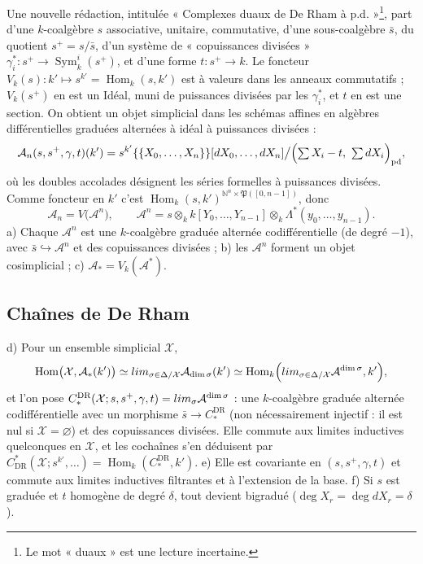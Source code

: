 \documentclass[11pt,a4paper]{article}
\begin{document}
Une nouvelle rédaction, intitulée « Complexes duaux de De Rham à
p.d. »\footnote{Le mot « duaux » est une lecture incertaine.}, part d'une
$k$-coalgèbre $s$ associative, unitaire, commutative, d'une sous-coalgèbre
$\bar s$, du quotient $s^+ = s/\bar s$, d'un système de « copuissances
divisées » $\gamma^*_i : s^+ \to \operatorname{Sym}^i_k(s^+)$, et d'une forme
$t : s^+ \to k$. Le foncteur $V_k(s) : k' \mapsto s^{k'} =
\operatorname{Hom}_k(s, k')$ est à valeurs dans les anneaux commutatifs ;
$V_k(s^+)$ en est un Idéal, muni de puissances divisées par les
$\gamma^*_i$, et $t$ en est une section. On obtient un objet simplicial dans les
schémas affines en algèbres différentielles graduées alternées à idéal à
puissances divisées :
\[
\mathcal{A}_n(s,s^+,\gamma,t)(k') = s^{k'}\{\{X_0,\ldots,X_n\}\}[dX_0,\ldots,dX_n] \big/ \Bigl(\textstyle\sum X_i - t,\ \sum dX_i\Bigr)_{\mathrm{pd}} ,
\]
où les doubles accolades désignent les séries formelles à puissances
divisées. Comme foncteur en $k'$ c'est $\operatorname{Hom}_k(s,k')^{\mathbb{N}^n
\times \mathfrak{P}([0,n-1])}$, donc
\[
\mathcal{A}_n = V\bigl(\mathcal{A}^n\bigr), \qquad \mathcal{A}^n = s \otimes_k k[Y_0,\ldots,Y_{n-1}] \otimes_k \Lambda^*(y_0,\ldots,y_{n-1}) .
\]
a) Chaque $\mathcal{A}^n$ est une $k$-coalgèbre graduée alternée
codifférentielle (de degré $-1$), avec $\bar s \hookrightarrow \mathcal{A}^n$ et
des copuissances divisées ; b) les $\mathcal{A}^n$ forment un objet
cosimplicial ; c) $\mathcal{A}_* = V_k(\mathcal{A}^*)$.

\subsection*{Chaînes de De Rham}

d) Pour un ensemble simplicial $\mathcal{X}$,
\[
\operatorname{Hom}\bigl(\mathcal{X}, \mathcal{A}_*(k')\bigr) \simeq \varprojlim_{\sigma \in \Delta/\mathcal{X}} \mathcal{A}_{\dim\sigma}(k') \simeq \operatorname{Hom}_k\Bigl(\varinjlim_{\sigma \in \Delta/\mathcal{X}} \mathcal{A}^{\dim\sigma}, k'\Bigr) ,
\]
et l'on pose $C^{\mathrm{DR}}_*(\mathcal{X}; s, s^+, \gamma, t) =
\varinjlim_{\sigma} \mathcal{A}^{\dim\sigma}$ : une $k$-coalgèbre graduée
alternée codifférentielle avec un morphisme $\bar s \to C^{\mathrm{DR}}_*$ (non
nécessairement injectif : il est nul si $\mathcal{X} = \varnothing$) et des
copuissances divisées. Elle commute aux limites inductives quelconques en
$\mathcal{X}$, et les cochaînes s'en déduisent par
$C^*_{\mathrm{DR}}(\mathcal{X}; s^{k'},\ldots) = \operatorname{Hom}_k(C^{\mathrm{DR}}_*,
k')$. e) Elle est covariante en $(s, s^+, \gamma, t)$ et commute aux limites
inductives filtrantes et à l'extension de la base. f) Si $s$ est graduée et
$t$ homogène de degré $\delta$, tout devient bigradué ($\deg X_r = \deg dX_r =
\delta$).
\end{document}
